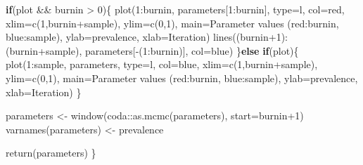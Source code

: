 \documentclass[
  12pt,
]{article}
\newenvironment{Shaded}{\begin{snugshade}}{\end{snugshade}}
\newcommand{\AttributeTok}[1]{\textcolor[rgb]{0.77,0.63,0.00}{#1}}
\newcommand{\ControlFlowTok}[1]{\textcolor[rgb]{0.13,0.29,0.53}{\textbf{#1}}}
\newcommand{\DecValTok}[1]{\textcolor[rgb]{0.00,0.00,0.81}{#1}}
\newcommand{\FunctionTok}[1]{\textcolor[rgb]{0.00,0.00,0.00}{#1}}
\newcommand{\NormalTok}[1]{#1}
\newcommand{\OtherTok}[1]{\textcolor[rgb]{0.56,0.35,0.01}{#1}}
\newcommand{\SpecialCharTok}[1]{\textcolor[rgb]{0.00,0.00,0.00}{#1}}
\newcommand{\StringTok}[1]{\textcolor[rgb]{0.31,0.60,0.02}{#1}}
\begin{document}
\begin{Shaded}
\begin{Highlighting}[]
  \ControlFlowTok{if}\NormalTok{(plot }\SpecialCharTok{\&\&}\NormalTok{ burnin }\SpecialCharTok{\textgreater{}} \DecValTok{0}\NormalTok{)\{}
    \FunctionTok{plot}\NormalTok{(}\DecValTok{1}\SpecialCharTok{:}\NormalTok{burnin, parameters[}\DecValTok{1}\SpecialCharTok{:}\NormalTok{burnin], }\AttributeTok{type=}\StringTok{\textquotesingle{}l\textquotesingle{}}\NormalTok{, }\AttributeTok{col=}\StringTok{\textquotesingle{}red\textquotesingle{}}\NormalTok{, }
         \AttributeTok{xlim=}\FunctionTok{c}\NormalTok{(}\DecValTok{1}\NormalTok{,burnin}\SpecialCharTok{+}\NormalTok{sample), }\AttributeTok{ylim=}\FunctionTok{c}\NormalTok{(}\DecValTok{0}\NormalTok{,}\DecValTok{1}\NormalTok{), }
         \AttributeTok{main=}\StringTok{\textquotesingle{}Parameter values (red:burnin, blue:sample)\textquotesingle{}}\NormalTok{, }
         \AttributeTok{ylab=}\StringTok{\textquotesingle{}prevalence\textquotesingle{}}\NormalTok{, }\AttributeTok{xlab=}\StringTok{\textquotesingle{}Iteration\textquotesingle{}}\NormalTok{)}
    \FunctionTok{lines}\NormalTok{((burnin}\SpecialCharTok{+}\DecValTok{1}\NormalTok{)}\SpecialCharTok{:}\NormalTok{(burnin}\SpecialCharTok{+}\NormalTok{sample), parameters[}\SpecialCharTok{{-}}\NormalTok{(}\DecValTok{1}\SpecialCharTok{:}\NormalTok{burnin)], }\AttributeTok{col=}\StringTok{\textquotesingle{}blue\textquotesingle{}}\NormalTok{)}
\NormalTok{  \}}\ControlFlowTok{else} \ControlFlowTok{if}\NormalTok{(plot)\{}
    \FunctionTok{plot}\NormalTok{(}\DecValTok{1}\SpecialCharTok{:}\NormalTok{sample, parameters, }\AttributeTok{type=}\StringTok{\textquotesingle{}l\textquotesingle{}}\NormalTok{, }\AttributeTok{col=}\StringTok{\textquotesingle{}blue\textquotesingle{}}\NormalTok{, }
         \AttributeTok{xlim=}\FunctionTok{c}\NormalTok{(}\DecValTok{1}\NormalTok{,burnin}\SpecialCharTok{+}\NormalTok{sample), }\AttributeTok{ylim=}\FunctionTok{c}\NormalTok{(}\DecValTok{0}\NormalTok{,}\DecValTok{1}\NormalTok{), }
         \AttributeTok{main=}\StringTok{\textquotesingle{}Parameter values (red:burnin, blue:sample)\textquotesingle{}}\NormalTok{, }
         \AttributeTok{ylab=}\StringTok{\textquotesingle{}prevalence\textquotesingle{}}\NormalTok{, }\AttributeTok{xlab=}\StringTok{\textquotesingle{}Iteration\textquotesingle{}}\NormalTok{)}
\NormalTok{  \}}

\NormalTok{  parameters }\OtherTok{\textless{}{-}} \FunctionTok{window}\NormalTok{(coda}\SpecialCharTok{::}\FunctionTok{as.mcmc}\NormalTok{(parameters), }\AttributeTok{start=}\NormalTok{burnin}\SpecialCharTok{+}\DecValTok{1}\NormalTok{)}
  \FunctionTok{varnames}\NormalTok{(parameters) }\OtherTok{\textless{}{-}} \StringTok{\textquotesingle{}prevalence\textquotesingle{}}
  
  \FunctionTok{return}\NormalTok{(parameters)}
\NormalTok{\}}
\end{Highlighting}
\end{Shaded}
\end{document}
